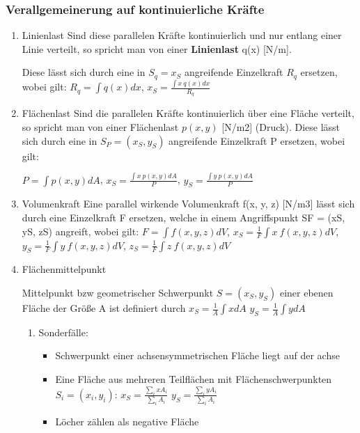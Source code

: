 \documentclass[11pt]{article}
\begin{document}
\subsubsection{Verallgemeinerung auf kontinuierliche Kräfte}
\label{sec:org037f798}
\begin{enumerate}
\item Linienlast
\label{sec:orgc1d21c5}
Sind diese parallelen Kräfte kontinuierlich und nur entlang einer Linie verteilt, so spricht man von einer \textbf{Linienlast} q(x) [N/m].

Diese lässt sich durch eine in \(S_q = {x_S}\) angreifende Einzelkraft \(R_q\) ersetzen, wobei gilt:
\(R_q = \int q(x) dx\), \(x_S = \frac{\int x \ q(x) dx}{R_q}\)
\item Flächenlast
\label{sec:orgb4b406b}
Sind die parallelen Kräfte kontinuierlich über eine Fläche verteilt, so spricht man von einer
Flächenlast \(p(x, y)\) [N/m2] (Druck).
Diese lässt sich durch eine in \(S_P = (x_S, y_S)\) angreifende Einzelkraft P ersetzen, wobei gilt:

\(P = \int p(x,y) dA\), \(x_S = \frac{\int x \ p(x,y) dA}{P}\), \(y_S = \frac{\int y \ p(x,y) dA}{P}\)
\item Volumenkraft
\label{sec:orgc2890c2}
Eine parallel wirkende Volumenkraft f(x, y, z) [N/m3] lässt sich durch eine Einzelkraft F ersetzen, welche in einem Angriffspunkt SF = (xS, yS, zS) angreift, wobei gilt:
\(F = \int f(x,y,z)dV\), \(x_S = \frac{1}{F} \int x \ f(x,y,z)dV\), \(y_S = \frac{1}{F} \int y \ f(x,y,z)dV\), \(z_S = \frac{1}{F} \int z \ f(x,y,z)dV\)

\item Flächenmittelpunkt
\label{sec:orgdbeb15f}

Mittelpunkt bzw geometrischer Schwerpunkt \(S = (x_S, y_S)\) einer ebenen Fläche der Größe A ist definiert durch
\(x_S = \frac{1}{A} \int x dA\)
\(y_S = \frac{1}{A} \int y dA\)

\begin{enumerate}
\item Sonderfälle:
\label{sec:orgbf954a0}
\begin{itemize}
\item Schwerpunkt einer achsensymmetrischen Fläche liegt auf der achse
\item Eine Fläche aus mehreren Teilflächen mit Flächenschwerpunkten \(S_i = (x_i,y_i)\):
\(x_S = \frac{\sum_i x A_i}{\sum_i A_i}\)
\(y_S = \frac{\sum_i y A_i}{\sum_i A_i}\)
\item Löcher zählen als negative Fläche
\end{itemize}


\end{enumerate}
\end{enumerate}
\end{document}
